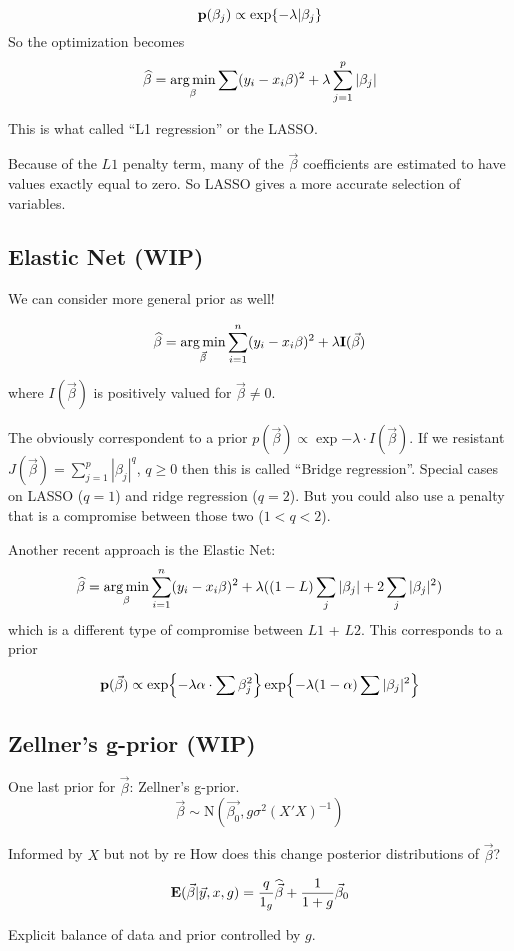 \[
{\mathbf p}(\beta_j) \propto \exp{-\lambda| \beta_j}
\]
So the optimization becomes 
\[
\widehat{\beta} = \operatorname*{arg\,min}_{\beta} \sum (y_i - x_i\beta)^2 + \lambda \sum_{j=1}^p |\beta_j|
\]

This is what called ``L1 regression'' or the LASSO.

Because of the $L1$ penalty term, many of the $\Vec{\beta}$ coefficients are estimated to have values exactly equal to zero. So LASSO gives a more accurate selection of variables.


\subsection{Elastic Net (WIP)}
We can consider more general prior as well!

\[
\widehat{\beta} = \operatorname*{arg\,min}_{\Vec{\beta}} \sum_{i=1}^n (y_i - x_i\beta)^2 + \lambda {\mathbf I}(\Vec{\beta})
\]

where $I(\Vec{\beta})$ is positively valued for $\Vec{\beta} \neq 0$.

The obviously correspondent to a prior $p(\Vec{\beta}) \propto \exp{-\lambda \cdot I(\Vec{\beta})}$. If we resistant $J(\Vec{\beta}) = \sum_{j=1}^p |\beta_j|^q$, $q \ge 0$ then this is called ``Bridge regression''. Special cases on LASSO ($q=1$) and ridge regression ($q=2$). But you could also use a penalty that is a compromise between those two ($1 < q < 2$).

Another recent approach is the Elastic Net:
\[
\widehat \beta = \operatorname*{arg\,min}_{\beta} \sum_{i=1}^n (y_i - x_i \beta)^2 + \lambda ((1 - L) \sum_j |\beta_j| + 2 \sum_j |\beta_j|^2)
\]
which is a different type of compromise between $L1$ + $L2$. This corresponds to a prior 

\[
{\mathbf p}(\Vec{\beta}) \propto 
\exp{-\lambda \alpha \cdot \sum \beta_j^2}
\exp{-\lambda (1-\alpha) \sum |\beta_j|^2}
\]

\subsection{Zellner's g-prior (WIP)}

One last prior for $\Vec{\beta}$: Zellner's g-prior.
\[
\Vec{\beta} \sim \text{N}(\Vec{\beta_0}, g\sigma^2(X'X)^{-1})
\]

Informed by $X$ but not by re
How does this change posterior distributions of $\Vec{\beta}$?

\[
{\mathbf E}(\Vec{\beta}| \Vec{y}, x, g) = \frac{q}{1_g} \widehat{\Vec{\beta}} + \frac{1}{1+g}\Vec{\beta}_0
\]

Explicit balance of data and prior controlled by $g$.

